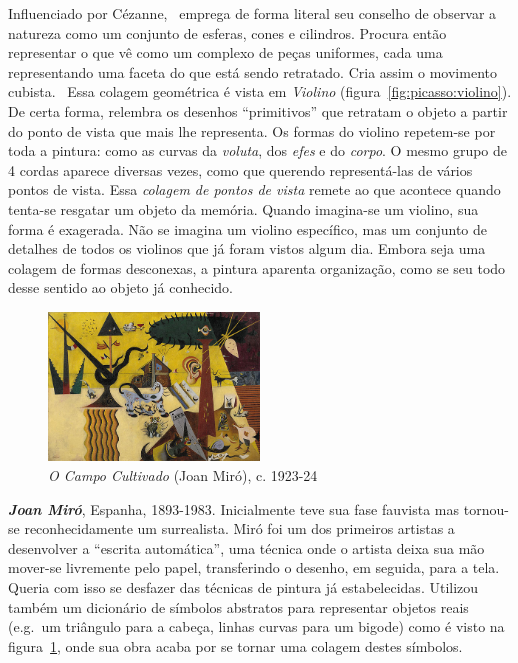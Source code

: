 Influenciado por Cézanne,~\cite{rishel} emprega de forma literal seu
conselho de observar a natureza como um conjunto de esferas, cones e
cilindros. Procura então representar o que vê como um complexo de
peças uniformes, cada uma representando uma faceta do que está sendo
retratado. Cria assim o movimento cubista.~\cite{barr,golding} Essa
colagem geométrica é vista em \emph{Violino}
(figura~\ref{fig:picasso:violino}). De certa forma, relembra os
desenhos ``primitivos'' que retratam o objeto a partir do ponto de
vista que mais lhe representa. Os formas do violino repetem-se por
toda a pintura: como as curvas da \textit{voluta}, dos \textit{efes} e
do \textit{corpo}. O mesmo grupo de 4 cordas aparece diversas vezes,
como que querendo representá-las de vários pontos de
vista. Essa \textit{colagem de pontos de vista} remete ao que acontece
quando tenta-se resgatar um objeto da memória. Quando imagina-se um
violino, sua forma é exagerada. Não se imagina um violino específico,
mas um conjunto de detalhes de todos os violinos que já foram vistos
algum dia. Embora seja uma colagem de formas desconexas, a pintura
aparenta organização, como se seu todo desse sentido ao objeto já
conhecido.~\cite{gombrich}

\begin{figure}
  \vspace{-15pt}
  \begin{centering}
      \caption{\emph{O Campo Cultivado} (Joan Miró), c. 1923-24}
     \label{fig:miro:campo}
    \includegraphics[width=0.5\textwidth]{figs/miro_campo.png}
  \end{centering}
\end{figure}

\textbf{\emph{Joan Miró}}, Espanha, 1893-1983. Inicialmente teve sua fase
fauvista mas tornou-se reconhecidamente um surrealista. Miró foi um
dos primeiros artistas a desenvolver a ``escrita automática'', uma
técnica onde o artista deixa sua mão mover-se livremente pelo papel,
transferindo o desenho, em seguida, para a tela.~\cite{montagu} Queria
com isso se desfazer das técnicas de pintura já
estabelecidas. Utilizou também um dicionário de símbolos abstratos
para representar objetos reais (e.g.\ um triângulo para a cabeça,
linhas curvas para um bigode) como é visto na
figura~\ref{fig:miro:campo}, onde sua obra acaba por se tornar uma
colagem destes símbolos.~\cite{stich}

